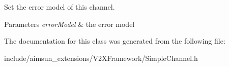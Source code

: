 Set the error model of this channel. 


\begin{DoxyParams}{Parameters}
{\em error\+Model} & the error model \\
\hline
\end{DoxyParams}


The documentation for this class was generated from the following file\+:\begin{DoxyCompactItemize}
\item 
include/aimsun\+\_\+extensions/\+V2\+X\+Framework/Simple\+Channel.\+h\end{DoxyCompactItemize}
